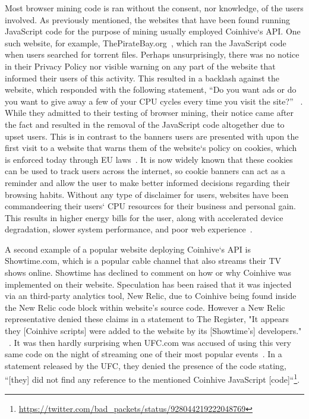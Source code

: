Most browser mining code is ran without the consent, nor knowledge, of the users involved. As previously mentioned, the websites that have been found running JavaScript code for the purpose of mining usually employed Coinhive`s API. One such website, for example, ThePirateBay.org~\cite{bbcmintcrypto}, which ran the JavaScript code when users searched for torrent files. Perhaps unsurprisingly, there was no notice in their Privacy Policy nor visible warning on any part of the website that informed their users of this activity. This resulted in a backlash against the website, which responded with the following statement, ``Do you want ads or do you want to give away a few of your CPU cycles every time you visit the site?'' ~\cite{piratesbayblog}. While they admitted to their testing of browser mining, their notice came after the fact and resulted in the removal of the JavaScript code altogether due to upset users. This is in contrast to the banners users are presented with upon the first visit to a website that warns them of the website`s policy on cookies, which is enforced today through EU laws~\cite{eucookie}. It is now widely known that these cookies can be used to track users across the internet, so cookie banners can act as a reminder and allow the user to make better informed decisions regarding their browsing habits. Without any type of disclaimer for users, websites have been commandeering their users` CPU resources for their business and personal gain. This results in higher energy bills for the user, along with accelerated device degradation, slower system performance, and poor web experience~\cite{httparchiveminingimpact}\cite{gaurdianelectricity}.


A second example of a popular website deploying Coinhive`s API is Showtime.com, which is a popular cable channel that also streams their TV shows online. Showtime has declined to comment on how or why Coinhive was implemented on their website. Speculation has been raised that it was injected via an third-party analytics tool, New Relic, due to Coinhive being found inside the New Relic code block within website's source code. However a New Relic representative denied these claims in a statement to The Register, "It appears they [Coinhive scripts] were added to the website by its [Showtime's] developers." ~\cite{registershowtime}. 
It was then hardly surprising when UFC.com was accused of using this very same code on the night of streaming one of their most popular events~\cite{registerufcmonero}. In a statement released by the UFC, they denied the presence of the code stating, ``[they] did not find any reference to the mentioned Coinhive JavaScript [code]``\footnote{\url{https://twitter.com/bad_packets/status/928044219222048769}}.
 
